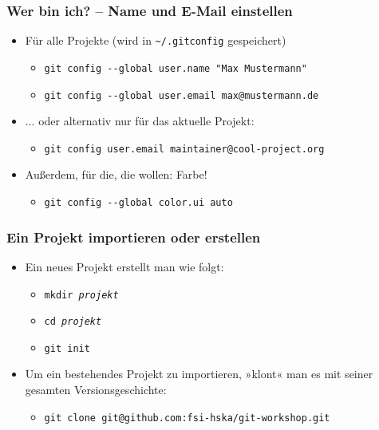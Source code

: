 \documentclass{beamer}
\begin{document}
\begin{frame}
\frametitle{Wer bin ich? -- Name und E-Mail einstellen}



\begin{itemize}
	\item Für alle Projekte (wird in \texttt{\~{}/.gitconfig} gespeichert)
\begin{itemize}
	\item \texttt{git config -{}-global user.name "Max Mustermann"}
	\item \texttt{git config -{}-global user.email max@mustermann.de}
\end{itemize}
\end{itemize}

\begin{itemize}
	\item ... oder alternativ nur für das aktuelle Projekt:
\begin{itemize}
	\item \texttt{git config user.email maintainer@cool-project.org}
\end{itemize}
\end{itemize}

\begin{itemize}
	\item Außerdem, für die, die wollen: Farbe!
\begin{itemize}
	\item \texttt{git config -{}-global color.ui auto}
\end{itemize}
\end{itemize}


\end{frame}
\begin{frame}
\frametitle{Ein Projekt importieren oder erstellen}

\begin{itemize}
	\item Ein neues Projekt erstellt man wie folgt:
\begin{itemize}
	\item \texttt{mkdir \emph{projekt}}
	\item \texttt{cd \emph{projekt}}
	\item \texttt{git init}
\end{itemize}
\end{itemize}

\begin{itemize}
	\item Um ein bestehendes Projekt zu importieren, »klont« man es mit seiner gesamten Versionsgeschichte:
\begin{itemize}
	\item \texttt{git clone git@github.com:fsi-hska/git-workshop.git}
\end{itemize}
\end{itemize}


\end{frame}
\end{document}
